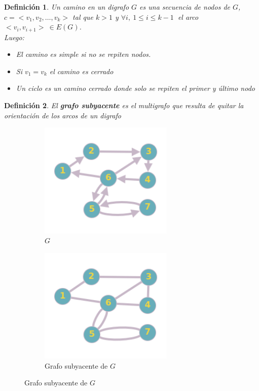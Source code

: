 \documentclass[a4paper,1pt]{report}
\newtheorem*{dfn}{Definición}
\begin{document}
\begin{dfn}
 Un camino en un digrafo $G$ es una secuencia de nodos de $G$, $c=<v_1,v_2,\dots,v_k>$ tal que $k>1$ y $\forall i, \ 1 \leq i \leq k-1\ $ el arco $<v_i, v_{i+1}> \ \in E(G)$.
\\
Luego:
\begin{itemize}
 \item El camino es simple si no se repiten nodos.
 \item Si $v_1=v_k$ el camino es cerrado
 \item Un ciclo es un camino cerrado donde solo se repiten el primer y último nodo
\end{itemize}

\end{dfn}

\begin{dfn}
 El \textbf{grafo subyacente} es el multigrafo que resulta de quitar la orientación de los arcos de un digrafo
\end{dfn}
\begin{figure}[H]
    \centering
    \begin{subfigure}[b]{0.45\textwidth}
        \centering
        \includegraphics[width=0.7\textwidth]{figures8/digrafo.png}
        \caption{$G$}
    \end{subfigure} 
        \begin{subfigure}[b]{0.45\textwidth}
        \centering
        \includegraphics[width=0.7\textwidth]{figures8/Gsubyecente.png}
        \caption{Grafo subyacente de $G$}
         \end{subfigure} 
\end{figure} 
\end{document}

